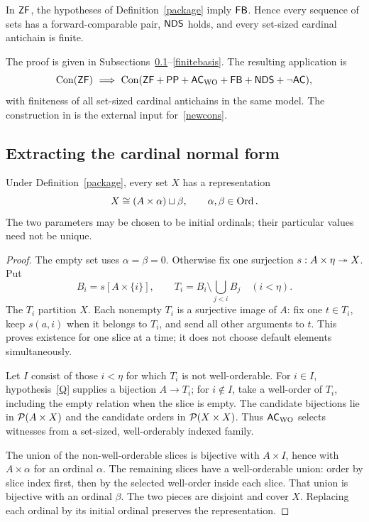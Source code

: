 \begin{theorem}\label{central}
In $\mathsf{ZF}$, the hypotheses of Definition~\ref{package} imply $\mathsf{FB}$. Hence every sequence of sets has a forward-comparable pair, $\mathsf{NDS}$ holds, and every set-sized cardinal antichain is finite.
\end{theorem}

The proof is given in Subsections~\ref{normal}--\ref{finitebasis}. The resulting application is
\begin{equation}\label{newcons}
 \operatorname{Con}(\mathsf{ZF})\ \Longrightarrow\
 \operatorname{Con}(\mathsf{ZF}+\mathsf{PP}+\mathsf{AC}_{\mathrm{WO}}+\mathsf{FB}+\mathsf{NDS}+\neg\mathsf{AC}),
\end{equation}
with finiteness of all set-sized cardinal antichains in the same model. The construction in \cite{OpenAI} is the external input for~\eqref{newcons}.

\subsection{Extracting the cardinal normal form}\label{normal}

\begin{lemma}\label{NF}
Under Definition~\ref{package}, every set $X$ has a representation
\begin{equation}\label{normalform}
 X\cong(A\times\alpha)\sqcup\beta,
 \qquad \alpha,\beta\in\operatorname{Ord}.
\end{equation}
The two parameters may be chosen to be initial ordinals; their particular values need not be unique.
\end{lemma}
\begin{proof}
The empty set uses $\alpha=\beta=0$. Otherwise fix one surjection $s:A\times\eta\twoheadrightarrow X$. Put
\[
 B_i=s[A\times\{i\}],\qquad
 T_i=B_i\setminus\bigcup_{j<i}B_j\quad(i<\eta).
\]
The $T_i$ partition $X$. Each nonempty $T_i$ is a surjective image of $A$: fix one $t\in T_i$, keep $s(a,i)$ when it belongs to $T_i$, and send all other arguments to $t$. This proves existence for one slice at a time; it does not choose default elements simultaneously.

Let $I$ consist of those $i<\eta$ for which $T_i$ is not well-orderable. For $i\in I$, hypothesis~\ref{Q} supplies a bijection $A\to T_i$; for $i\notin I$, take a well-order of $T_i$, including the empty relation when the slice is empty. The candidate bijections lie in $\mathcal P(A\times X)$ and the candidate orders in $\mathcal P(X\times X)$. Thus $\mathsf{AC}_{\mathrm{WO}}$ selects witnesses from a set-sized, well-orderably indexed family.

The union of the non-well-orderable slices is bijective with $A\times I$, hence with $A\times\alpha$ for an ordinal $\alpha$. The remaining slices have a well-orderable union: order by slice index first, then by the selected well-order inside each slice. That union is bijective with an ordinal $\beta$. The two pieces are disjoint and cover $X$. Replacing each ordinal by its initial ordinal preserves the representation.
\end{proof}

